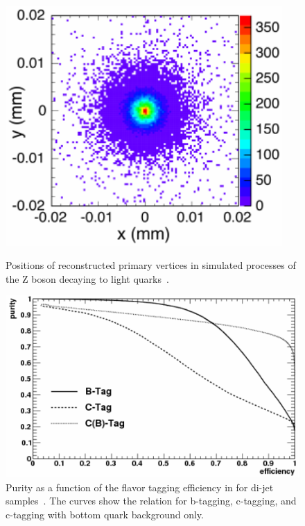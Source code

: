 \begin{figure}[!h]
\centering
 \begin{minipage}[t]{0.44\textwidth}
 \centering
\includegraphics[width=0.94\textwidth]{Figures/Vertex_resolution.pdf}
\caption[Plot of reconstructed \sid vertex positions]{Positions of reconstructed primary vertices in simulated processes of the Z boson decaying to light quarks~\cite[p. 148]{TDR4}.}
\label{fig:vertex_res}
\end{minipage}
\hfill
\begin{minipage}[t]{0.55\textwidth}
\centering
\includegraphics[width=\textwidth]{Figures/flavor_tagging_eff.pdf}
\caption[Flavor tagging purity vs. efficiency in \sid]{Purity as a function of the flavor tagging efficiency in \sid for di-jet samples~\cite[p. 99]{LOI}.
The curves show the relation for b-tagging, c-tagging, and c-tagging with bottom quark background only.}
\label{fig:tagging}
\end{minipage}
\end{figure}

